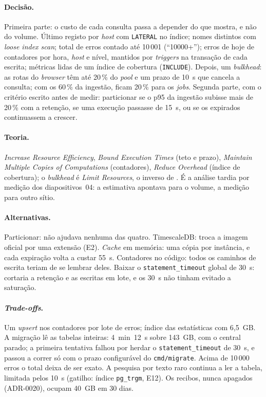 \paragraph{Decisão.}
Primeira parte: o custo de cada consulta passa a depender do que mostra, e não do volume. Último registo por
\emph{host} com \texttt{LATERAL} no índice; nomes distintos com \emph{loose index scan}; total de erros contado até
10\,001 (``10000+''); erros de hoje de contadores por hora, \emph{host} e nível, mantidos por \emph{triggers} na
transação de cada escrita; métricas lidas de um índice de cobertura (\texttt{INCLUDE}). Depois, um
\emph{bulkhead}: as rotas do \emph{browser} têm até 20\,\% do \emph{pool} e um prazo de 10~s que cancela a consulta;
com os 60\,\% da ingestão, ficam 20\,\% para os \emph{jobs}. Segunda parte, com o critério escrito antes de medir:
particionar se o p95 da ingestão subisse mais de 20\,\% com a retenção, se uma execução passasse de 15~s, ou se os
expirados continuassem a crescer.

\paragraph{Teoria.}
\emph{Increase Resource Efficiency}, \emph{Bound Execution Times} (teto e prazo), \emph{Maintain Multiple Copies of
Computations} (contadores), \emph{Reduce Overhead} (índice de cobertura); o \emph{bulkhead} é \emph{Limit Resources},
o inverso de . É a análise tardia por medição dos diapositivos~04: a estimativa apontava para o volume, a
medição para outro sítio.

\paragraph{Alternativas.}
Particionar: não ajudava nenhuma das quatro. TimescaleDB: troca a imagem oficial por uma extensão (E2). \emph{Cache}
em memória: uma cópia por instância, e cada expiração volta a custar 55~s. Contadores no código: todos os caminhos de
escrita teriam de se lembrar deles. Baixar o \texttt{statement\_timeout} global de 30~s: cortaria a retenção e as
escritas em lote, e os 30~s não tinham evitado a saturação.

\paragraph{\emph{Trade-offs}.}
Um \emph{upsert} nos contadores por lote de erros; índice das estatísticas com 6,5~GB. A migração lê as tabelas
inteiras: 4~min~12~s sobre 143~GB, com o central parado; a primeira tentativa falhou por herdar o
\texttt{statement\_timeout} de 30~s, e passou a correr só com o prazo configurável do \texttt{cmd/migrate}. Acima
de 10\,000 erros o total deixa de ser exato. A pesquisa por texto raro continua a ler a tabela, limitada pelos 10~s
(gatilho: índice \texttt{pg\_trgm}, E12). Os recibos, nunca apagados (ADR-0020), ocupam 40~GB em 30 dias.

